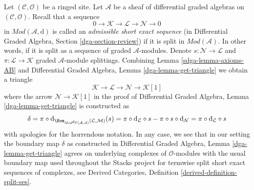 Let $(\mathcal{C}, \mathcal{O})$ be a ringed site.
Let $\mathcal{A}$ be a sheaf of differential graded algebras
on $(\mathcal{C}, \mathcal{O})$.
Recall that a sequence
$$
0 \to \mathcal{K} \to \mathcal{L} \to \mathcal{N} \to 0
$$
in $\textit{Mod}(\mathcal{A}, \text{d})$
is called an {\it admissible short exact sequence}
(in Differential Graded Algebra, Section \ref{dga-section-review})
if it is split in $\textit{Mod}(\mathcal{A})$. In other words, if it is split
as a sequence of graded $\mathcal{A}$-modules. Denote
$s : \mathcal{N} \to \mathcal{L}$ and
$\pi : \mathcal{L} \to \mathcal{K}$
graded $\mathcal{A}$-module splittings.
Combining Lemma \ref{sdga-lemma-axioms-AB} and
Differential Graded Algebra, Lemma \ref{dga-lemma-get-triangle}
we obtain a triangle
$$
\mathcal{K} \to \mathcal{L} \to \mathcal{N} \to \mathcal{K}[1]
$$
where the arrow $\mathcal{N} \to \mathcal{K}[1]$ in the proof
of Differential Graded Algebra, Lemma \ref{dga-lemma-get-triangle}
is constructed as
$$
\delta = \pi \circ
\text{d}_{\Hom_{\textit{Mod}^{dg}(\mathcal{A}, \text{d})}
(\mathcal{L}, \mathcal{M})}(s) =
\pi \circ \text{d}_\mathcal{L} \circ s -
\pi \circ s \circ \text{d}_\mathcal{N} =
\pi \circ \text{d}_\mathcal{L} \circ s
$$
with apologies for the horrendous notation. In any case, we see that
in our setting the boundary map $\delta$ as constructed in
Differential Graded Algebra, Lemma \ref{dga-lemma-get-triangle}
agrees on underlying complexes of $\mathcal{O}$-modules
with the usual boundary map used throughout the Stacks project
for termwise split short exact sequences of complexes, see
Derived Categories, Definition \ref{derived-definition-split-ses}.

